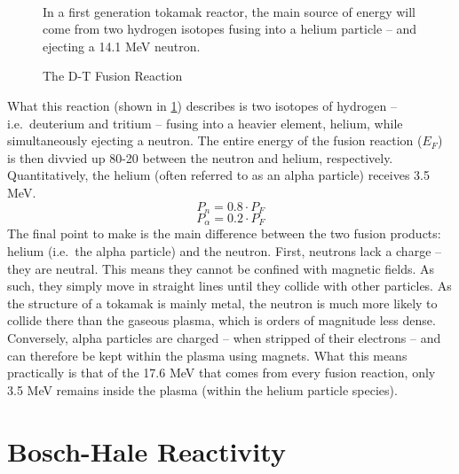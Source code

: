 \begin{figure}
	\centering
	\begin{adjustbox}{width=0.75\textwidth}
		
	\end{adjustbox}
	\caption{The D-T Fusion Reaction} ~\\
	\small In a first generation tokamak reactor, the main source of energy will come from two hydrogen isotopes fusing into a helium particle -- and ejecting a 14.1 MeV neutron.
	\label{fig:fusion_reaction}
\end{figure}

What this reaction (shown in \cref{fig:fusion_reaction}) describes is two isotopes of hydrogen -- i.e.\ deuterium and tritium -- fusing into a heavier element, helium, while simultaneously ejecting a neutron. The entire energy of the fusion reaction ($E_F$) is then divvied up 80-20 between the neutron and helium, respectively. Quantitatively, the helium (often referred to as an alpha particle) receives 3.5 MeV.
\begin{equation}
	P_n = 0.8 \cdot P_F
	\label{eq:p_n}
\end{equation}
\begin{equation}
	P_\alpha = 0.2 \cdot P_F
	\label{eq:palpha}
\end{equation}
The final point to make is the main difference between the two fusion products: helium (i.e.\ the alpha particle) and the neutron. First, neutrons lack a charge -- they are neutral. This means they cannot be confined with magnetic fields. As such, they simply move in straight lines until they collide with other particles. As the structure of a tokamak is mainly metal, the neutron is much more likely to collide there than the gaseous plasma, which is orders of magnitude less dense. Conversely, alpha particles are charged -- when stripped of their electrons -- and can therefore be kept within the plasma using magnets. What this means practically is that of the 17.6 MeV that comes from every fusion reaction, only 3.5 MeV remains inside the plasma (within the helium particle species).

\section{Bosch-Hale Reactivity}

